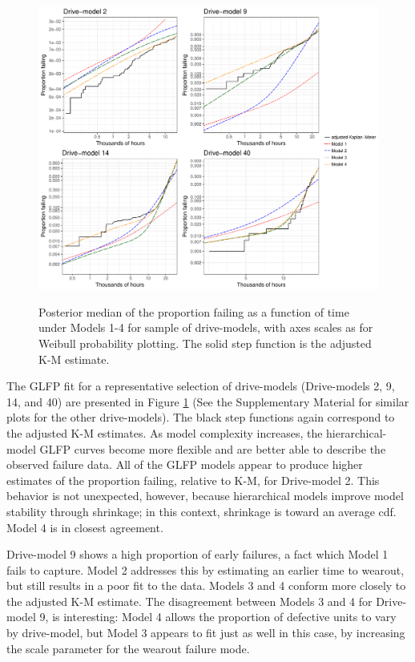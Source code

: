 \documentclass[12pt]{article}
\begin{document}
\begin{figure}[H]
{\centering
\includegraphics[width=\textwidth]{single-drive-4-Models-ex}}
\caption{Posterior median of the proportion failing as a function of time under Models 1-4 for sample of drive-models, with axes scales as for Weibull probability plotting.  The solid step function is the adjusted K-M estimate.}
\label{fig:mod_comp_leg}
\end{figure}

The GLFP fit for a representative selection of drive-models (Drive-models 2, 9, 14, and 40) are presented in Figure \ref{fig:mod_comp_leg} (See the Supplementary Material for similar plots for the other drive-models).  The black step functions again correspond to the adjusted K-M estimates.  As model complexity increases, the hierarchical-model GLFP curves become more flexible and are better able to describe the observed failure data.  All of the GLFP models appear to produce higher estimates of the proportion failing, relative to K-M, for Drive-model 2. This behavior is not unexpected, however, because hierarchical models improve model stability through shrinkage; in this context, shrinkage is toward an average cdf. Model 4 is in closest agreement. 

Drive-model 9 shows a high proportion of early failures, a fact which Model 1 fails to capture. Model 2 addresses this by estimating an earlier time to wearout, but still results in a poor fit to the data. Models 3 and 4 conform more closely to the adjusted K-M estimate. The disagreement between Models 3 and 4 for Drive-model 9, is interesting: Model 4 allows the proportion of defective units to vary by drive-model, but Model 3 appears to fit just as well in this case, by increasing the scale parameter for the wearout failure mode.
\end{document}
